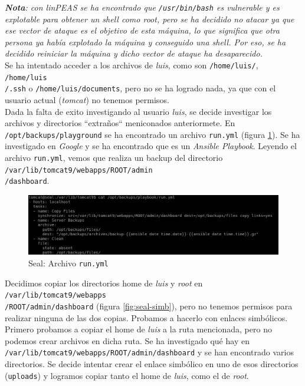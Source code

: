 \textit{\textbf{Nota}: con linPEAS se ha encontrado que \texttt{/usr/bin/bash} es vulnerable y es explotable para obtener un shell como root, pero se ha decidido no atacar ya que ese vector de ataque es el objetivo de esta máquina, lo que significa que otra persona ya había explotado la máquina y conseguido una shell. Por eso, se ha decidido reiniciar la máquina y dicho vector de ataque ha desaparecido.}\\

Se ha intentado acceder a los archivos de \textit{luis}, como son \texttt{/home/luis/}, \texttt{/home/luis\\/.ssh} o \texttt{/home/luis/documents}, pero no se ha logrado nada, ya que con el usuario actual (\textit{tomcat}) no tenemos permisos.\\

Dada la falta de exito investigando al usuario \textit{luis}, se decide investigar los archivos y directorios ``extraños`` meniconados anteriormete. En \texttt{/opt/backups/playground} se ha encontrado un archivo \texttt{run.yml} (figura \ref{fig:seal-run}). Se ha investigado en \textit{Google} y se ha encontrado que es un \textit{Ansible Playbook}\cite{ansible-playbooks}. Leyendo el archivo \texttt{run.yml}, vemos que realiza un backup del directorio \texttt{/var/lib/tomcat9/webapps/ROOT/admin\\/dashboard}.\\

\begin{figure}[h]
    \centering
    \includegraphics[width=1.0\textwidth]{images/machines/seal/run-yml.png}
    \caption{Seal: Archivo \texttt{run.yml}}
    \label{fig:seal-run}
\end{figure}

Decidimos copiar los directorios home de \textit{luis} y \textit{root} en \texttt{/var/lib/tomcat9/webapps\\/ROOT/admin/dashboard} (figura \ref{fig:seal-simb}), pero no tenemos permisos para realizar ninguna de las dos copias. Probamos a hacerlo con enlaces simbólicos. Primero probamos a copiar el home de \textit{luis} a la ruta mencionada, pero no podemos crear archivos en dicha ruta. Se ha investigado qué hay en \texttt{/var/lib/tomcat9/webapps/ROOT/admin/dashboard} y se han encontrado varios directorios. Se decide intentar crear el enlace simbólico en uno de esos directorios (\texttt{uploads}) y logramos copiar tanto el home de \textit{luis}, como el de \textit{root}.

